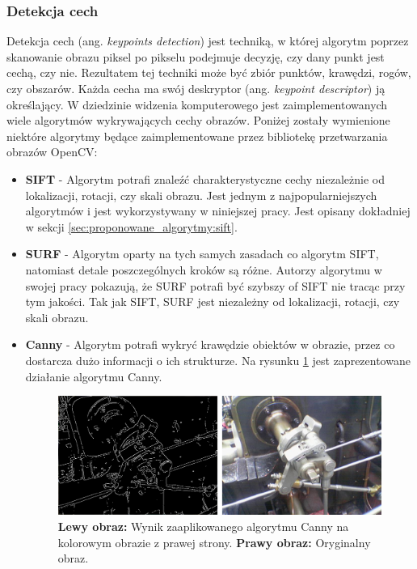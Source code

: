 \subsubsection{Detekcja cech}

Detekcja cech (ang. \textit{keypoints detection}) jest techniką, w której algorytm poprzez skanowanie obrazu piksel po pikselu podejmuje decyzję, czy dany punkt jest cechą, czy nie. Rezultatem tej techniki może być zbiór punktów, krawędzi, rogów, czy obszarów. Każda cecha ma swój deskryptor (ang. \textit{keypoint descriptor}) ją określający. W dziedzinie widzenia komputerowego jest zaimplementowanych wiele algorytmów wykrywających cechy obrazów. Poniżej zostały wymienione niektóre algorytmy będące zaimplementowane przez bibliotekę przetwarzania obrazów OpenCV:

\begin{itemize}
\item \textbf{SIFT} \cite{Lowe:2004:DIF:993451.996342} - Algorytm potrafi znaleźć charakterystyczne cechy niezależnie od lokalizacji, rotacji, czy skali obrazu. Jest jednym z najpopularniejszych algorytmów i jest wykorzystywany w niniejszej pracy. Jest opisany dokładniej w sekcji \ref{sec:proponowane_algorytmy:sift}.
\item \textbf{SURF} \cite{Bay:2008} - Algorytm oparty na tych samych zasadach co algorytm SIFT, natomiast detale poszczególnych kroków są różne. Autorzy algorytmu w swojej pracy pokazują, że SURF potrafi być szybszy of SIFT nie tracąc przy tym jakości. Tak jak SIFT, SURF jest niezależny od lokalizacji, rotacji, czy skali obrazu.
\item \textbf{Canny} \cite{Canny:1986} - Algorytm potrafi wykryć krawędzie obiektów w obrazie, przez co dostarcza dużo informacji o ich strukturze. Na rysunku \ref{fig:algorytmy_korejestracji:canny} jest zaprezentowane działanie algorytmu Canny.

\begin{figure}[htb]
  \centering
  \includegraphics[width=\textwidth]{gfx/canny}
  \caption{\textbf{Lewy obraz:} Wynik zaaplikowanego algorytmu Canny na kolorowym obrazie z prawej strony. \textbf{Prawy obraz:} Oryginalny obraz.}
  \label{fig:algorytmy_korejestracji:canny}
\end{figure}

\end{itemize}

